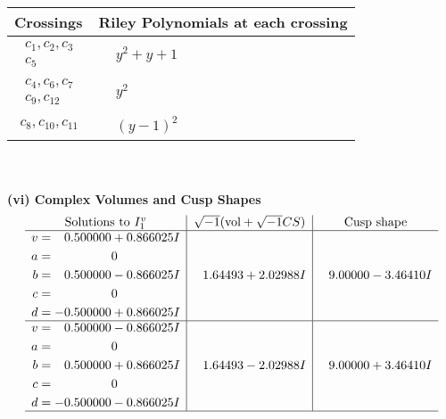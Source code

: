 \documentclass[1p]{elsarticle_modified}
\theoremstyle{definition}
\newcommand{\I}{\sqrt{-1}}
\begin{document}
\begin{tabular}{m{50pt}|m{274pt}}
Crossings & \hspace{64pt}Riley Polynomials at each crossing \\
\hline $$\begin{aligned}c_{1},c_{2},c_{3}\\c_{5}\end{aligned}$$&$\begin{aligned}
&y^2+y+1
\end{aligned}$\\
\hline $$\begin{aligned}c_{4},c_{6},c_{7}\\c_{9},c_{12}\end{aligned}$$&$\begin{aligned}
&y^2
\end{aligned}$\\
\hline $$\begin{aligned}c_{8},c_{10},c_{11}\end{aligned}$$&$\begin{aligned}
&(y-1)^2
\end{aligned}$\\
\hline
\end{tabular}\\~\\
\newpage\flushleft \textbf{(vi) Complex Volumes and Cusp Shapes}
$$\begin{array}{c|c|c}  
\text{Solutions to }I^v_{1}& \I (\text{vol} + \sqrt{-1}CS) & \text{Cusp shape}\\
 \hline 
\begin{aligned}
v &= \phantom{-}0.500000 + 0.866025 I \\
a &= \phantom{-0.000000 } 0 \\
b &= \phantom{-}0.500000 - 0.866025 I \\
c &= \phantom{-0.000000 } 0 \\
d &= -0.500000 + 0.866025 I\end{aligned}
 & \phantom{-}1.64493 + 2.02988 I & \phantom{-}9.00000 - 3.46410 I \\ \hline\begin{aligned}
v &= \phantom{-}0.500000 - 0.866025 I \\
a &= \phantom{-0.000000 } 0 \\
b &= \phantom{-}0.500000 + 0.866025 I \\
c &= \phantom{-0.000000 } 0 \\
d &= -0.500000 - 0.866025 I\end{aligned}
 & \phantom{-}1.64493 - 2.02988 I & \phantom{-}9.00000 + 3.46410 I\\
 \hline 
 \end{array}$$\newpage\newpage\renewcommand{\arraystretch}{1}
\end{document}
